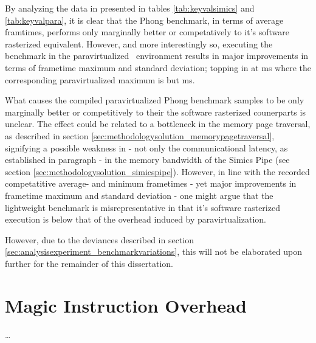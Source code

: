 
By analyzing the data in presented in tables \ref{tab:keyvalsimics} and \ref{tab:keyvalpara}, it is clear that the Phong benchmark, in terms of average framtimes, performs only marginally better or competatively to it's software rasterized equivalent.
However, and more interestingly so, executing the benchmark in the paravirtualized \dvttermsimics\ environment results in major improvements in terms of frametime maximum and standard deviation; topping in at  ms where the corresponding paravirtualized maximum is but  ms.

What causes the compiled paravirtualized Phong benchmark samples to be only marginally better or competitively to their the software rasterized counerparts is unclear.
The effect could be related to a bottleneck in the memory page traversal, as described in section \ref{sec:methodologysolution_memorypagetraversal}, signifying a possible weakness in - not only the communicational latency, as established in paragraph  - in the memory bandwidth of the Simics Pipe (see section \ref{sec:methodologysolution_simicspipe}).
However, in line with the recorded competatitive average- and minimum frametimes  - yet major improvements in frametime maximum and standard deviation - one might argue that the lightweight benchmark is misrepresentative in that it's software rasterized execution is below that of the overhead induced by paravirtualization.

However, due to the deviances described in section \ref{sec:analysisexperiment_benchmarkvariations}, this will not be elaborated upon further for the remainder of this dissertation.


\section{Magic Instruction Overhead}
\label{sec:analysisexperiment_magicinstructionoverhead}
\ldots


